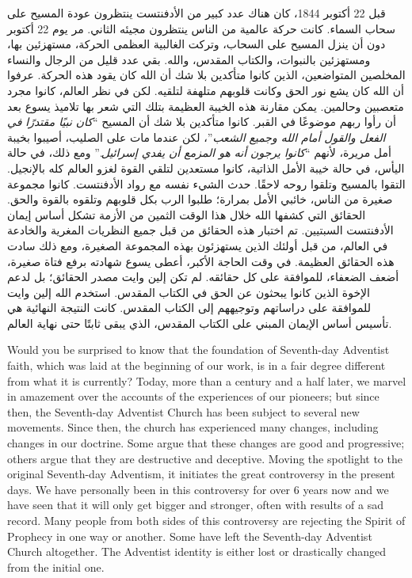 قبل 22 أكتوبر 1844، كان هناك عدد كبير من الأدفنتست ينتظرون عودة المسيح على سحاب السماء. كانت حركة عالمية من الناس ينتظرون مجيئه الثاني. مر يوم 22 أكتوبر دون أن ينزل المسيح على السحاب، وتركت الغالبية العظمى الحركة، مستهزئين بها، ومستهزئين بالنبوات، والكتاب المقدس، والله. بقي عدد قليل من الرجال والنساء المخلصين المتواضعين، الذين كانوا متأكدين بلا شك أن الله كان يقود هذه الحركة. عرفوا أن الله كان يشع نور الحق وكانت قلوبهم متلهفة لتلقيه. لكن في نظر العالم، كانوا مجرد متعصبين وحالمين. يمكن مقارنة هذه الخيبة العظيمة بتلك التي شعر بها تلاميذ يسوع بعد أن رأوا ربهم موضوعًا في القبر. كانوا متأكدين بلا شك أن المسيح “\textit{كان نبيًا مقتدرًا في الفعل والقول أمام الله وجميع الشعب}”، لكن عندما مات على الصليب، أصيبوا بخيبة أمل مريرة، لأنهم “\textit{كانوا يرجون أنه هو المزمع أن يفدي إسرائيل}.” ومع ذلك، في حالة اليأس، في حالة خيبة الأمل الذاتية، كانوا مستعدين لتلقي القوة لغزو العالم كله بالإنجيل. التقوا بالمسيح وتلقوا روحه لاحقًا. حدث الشيء نفسه مع رواد الأدفنتست. كانوا مجموعة صغيرة من الناس، خائبي الأمل بمرارة؛ طلبوا الرب بكل قلوبهم وتلقوه بالقوة والحق. الحقائق التي كشفها الله خلال هذا الوقت الثمين من الأزمة تشكل أساس إيمان الأدفنتست السبتيين. تم اختبار هذه الحقائق من قبل جميع النظريات المغرية والخادعة في العالم، من قبل أولئك الذين يستهزئون بهذه المجموعة الصغيرة، ومع ذلك سادت هذه الحقائق العظيمة. في وقت الحاجة الأكبر، أعطى يسوع شهادته برفع فتاة صغيرة، أضعف الضعفاء، للموافقة على كل حقائقه. لم تكن إلين وايت مصدر الحقائق؛ بل لدعم الإخوة الذين كانوا يبحثون عن الحق في الكتاب المقدس. استخدم الله إلين وايت للموافقة على دراساتهم وتوجيههم إلى الكتاب المقدس. كانت النتيجة النهائية هي تأسيس أساس الإيمان المبني على الكتاب المقدس، الذي يبقى ثابتًا حتى نهاية العالم.


Would you be surprised to know that the foundation of Seventh-day Adventist faith, which was laid at the beginning of our work, is in a fair degree different from what it is currently? Today, more than a century and a half later, we marvel in amazement over the accounts of the experiences of our pioneers; but since then, the Seventh-day Adventist Church has been subject to several new movements. Since then, the church has experienced many changes, including changes in our doctrine. Some argue that these changes are good and progressive; others argue that they are destructive and deceptive. Moving the spotlight to the original Seventh-day Adventism, it initiates the great controversy in the present days. We have personally been in this controversy for over 6 years now and we have seen that it will only get bigger and stronger, often with results of a sad record. Many people from both sides of this controversy are rejecting the Spirit of Prophecy in one way or another. Some have left the Seventh-day Adventist Church altogether. The Adventist identity is either lost or drastically changed from the initial one.


